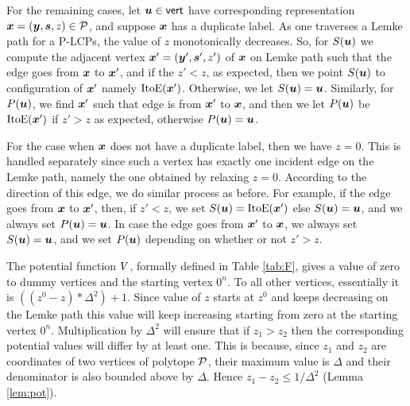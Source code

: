 For the remaining cases, let $\mbox{\boldmath $u$}\in \operatorname{\mathsf{vert}}$ have corresponding representation
$\mbox{\boldmath $x$}=(\mbox{\boldmath $y$},\mbox{\boldmath $s$},z)\in \mbox{${\mathcal P}$}$, and suppose $\mbox{\boldmath $x$}$ has a duplicate label. As one
traverses a Lemke path for a P-LCPs, the value of $z$ monotonically decreases.
So, for $S(\mbox{\boldmath $u$})$ we compute the adjacent vertex $\mbox{\boldmath $x$}'=(\mbox{\boldmath $y$}',\mbox{\boldmath $s$}',z')$ of $\mbox{\boldmath $x$}$
on Lemke path such that the edge goes from $\mbox{\boldmath $x$}$ to $\mbox{\boldmath $x$}'$, and if the $z'<z$,
as expected, then we point $S(\mbox{\boldmath $u$})$ to configuration of $\mbox{\boldmath $x$}'$ namely
$\mbox{ItoE}(\mbox{\boldmath $x$}')$. Otherwise, we let $S(\mbox{\boldmath $u$})=\mbox{\boldmath $u$}$. Similarly, for $P(\mbox{\boldmath $u$})$, we find
$\mbox{\boldmath $x$}'$ such that edge is from $\mbox{\boldmath $x$}'$ to $\mbox{\boldmath $x$}$, and then we let $P(\mbox{\boldmath $u$})$ be
$\mbox{ItoE}(\mbox{\boldmath $x$}')$ if $z'>z$ as expected, otherwise $P(\mbox{\boldmath $u$})=\mbox{\boldmath $u$}$. 

For the case when $\mbox{\boldmath $x$}$ does not have a duplicate label, then we have $z=0$. This is
handled separately since such a vertex has exactly one incident edge on the Lemke
path, namely the one obtained by relaxing $z=0$. According to the direction of 
this edge, we do similar process as before. For example, if the edge goes from 
$\mbox{\boldmath $x$}$ to $\mbox{\boldmath $x$}'$, then, if $z'<z$, we set $S(\mbox{\boldmath $u$})=\mbox{ItoE}(\mbox{\boldmath $x$}')$ else $S(\mbox{\boldmath $u$})=\mbox{\boldmath $u$}$,
and we always set $P(\mbox{\boldmath $u$})=\mbox{\boldmath $u$}$.  In case the edge goes from $\mbox{\boldmath $x$}'$ to $\mbox{\boldmath $x$}$, we
always set $S(\mbox{\boldmath $u$})=\mbox{\boldmath $u$}$, and we set $P(\mbox{\boldmath $u$})$ depending on whether or not $z'>z$.

%
\medskip

The potential function $\mbox{$V$}$, formally defined in Table \ref{tab:F},
gives a value of zero to dummy vertices and the starting vertex $0^n$. To all
other vertices, essentially it is $((z^0-z) * \Delta^2)+1$. Since value of $z$
starts at $z^0$ and keeps decreasing on the Lemke path this value will keep
increasing starting from zero at the starting vertex $0^n$. Multiplication by
$\Delta^2$ will ensure that if $z_1>z_2$ then the corresponding potential values 
will differ by at least one. This is because, since $z_1$ and $z_2$ are 
coordinates of two vertices of polytope $\mbox{${\mathcal P}$}$, their maximum value is $\Delta$
and their denominator is also bounded above by $\Delta$. Hence $z_1-z_2\le
1/\Delta^2$ (Lemma \ref{lem:pot}).  

